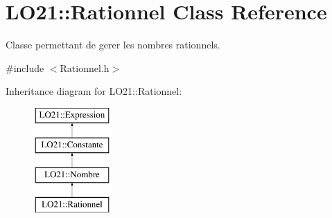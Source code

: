 \hypertarget{class_l_o21_1_1_rationnel}{\section{\-L\-O21\-:\-:\-Rationnel \-Class \-Reference}
\label{class_l_o21_1_1_rationnel}
}


\-Classe permettant de gerer les nombres rationnels.  




{\ttfamily \#include $<$\-Rationnel.\-h$>$}

\-Inheritance diagram for \-L\-O21\-:\-:\-Rationnel\-:\begin{figure}[H]
\begin{center}
\leavevmode
\includegraphics[height=4.000000cm]{class_l_o21_1_1_rationnel}
\end{center}
\end{figure}
